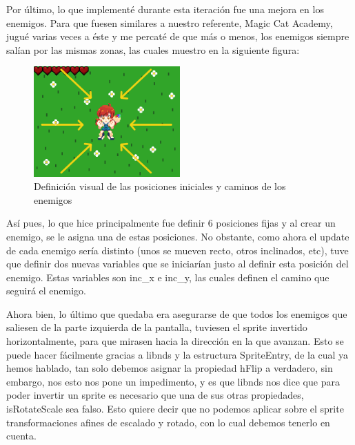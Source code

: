 \vspace{0.5cm}

Por último, lo que implementé durante esta iteración fue una mejora en los enemigos. Para que fuesen similares a nuestro referente, Magic Cat Academy, jugué varias veces a éste y me percaté de que más o menos, los enemigos siempre salían por las mismas zonas, las cuales muestro en la siguiente figura:

\vspace{0.5cm}

\begin{figure}[htbp]
\centering
  \includegraphics[width=0.5\textwidth]{archivos/spawn_enemies_position.png}
  \caption{Definición visual de las posiciones iniciales y caminos de los enemigos}
  \label{fig:spawn_enemies_position}
\end{figure}

\vspace{0.5cm}

Así pues, lo que hice principalmente fue definir 6 posiciones fijas y al crear un enemigo, se le asigna una de estas posiciones. No obstante, como ahora el update de cada enemigo sería distinto (unos se mueven recto, otros inclinados, etc), tuve que definir dos nuevas variables que se iniciarían justo al definir esta posición del enemigo. Estas variables son inc\_x e inc\_y, las cuales definen el camino que seguirá el enemigo.

\vspace{0.5cm}

Ahora bien, lo último que quedaba era asegurarse de que todos los enemigos que saliesen de la parte izquierda de la pantalla, tuviesen el sprite invertido horizontalmente, para que mirasen hacia la dirección en la que avanzan. Esto se puede hacer fácilmente gracias a libnds y la estructura SpriteEntry, de la cual ya hemos hablado, tan solo debemos asignar la propiedad hFlip a verdadero, sin embargo, nos esto nos pone un impedimento, y es que libnds nos dice que para poder invertir un sprite es necesario que una de sus otras propiedades, isRotateScale sea falso. Esto quiere decir que no podemos aplicar sobre el sprite transformaciones afines de escalado y rotado, con lo cual debemos tenerlo en cuenta.

